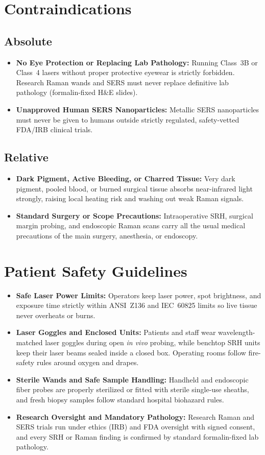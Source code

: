 \section{Contraindications}

\subsection{Absolute}
\begin{itemize}
  \item \textbf{No Eye Protection or Replacing Lab Pathology:} Running Class~3B or Class~4 lasers without proper protective eyewear is strictly forbidden. Research Raman wands and SERS must never replace definitive lab pathology (formalin-fixed H\&E slides).
  \item \textbf{Unapproved Human SERS Nanoparticles:} Metallic SERS nanoparticles must never be given to humans outside strictly regulated, safety-vetted FDA/IRB clinical trials.
\end{itemize}

\subsection{Relative}
\begin{itemize}
  \item \textbf{Dark Pigment, Active Bleeding, or Charred Tissue:} Very dark pigment, pooled blood, or burned surgical tissue absorbs near-infrared light strongly, raising local heating risk and washing out weak Raman signals.
  \item \textbf{Standard Surgery or Scope Precautions:} Intraoperative SRH, surgical margin probing, and endoscopic Raman scans carry all the usual medical precautions of the main surgery, anesthesia, or endoscopy.
\end{itemize}

\section{Patient Safety Guidelines}
\begin{itemize}
  \item \textbf{Safe Laser Power Limits:} Operators keep laser power, spot brightness, and exposure time strictly within ANSI~Z136 and IEC~60825 limits so live tissue never overheats or burns.
  \item \textbf{Laser Goggles and Enclosed Units:} Patients and staff wear wavelength-matched laser goggles during open \emph{in vivo} probing, while benchtop SRH units keep their laser beams sealed inside a closed box. Operating rooms follow fire-safety rules around oxygen and drapes.
  \item \textbf{Sterile Wands and Safe Sample Handling:} Handheld and endoscopic fiber probes are properly sterilized or fitted with sterile single-use sheaths, and fresh biopsy samples follow standard hospital biohazard rules.
  \item \textbf{Research Oversight and Mandatory Pathology:} Research Raman and SERS trials run under ethics (IRB) and FDA oversight with signed consent, and every SRH or Raman finding is confirmed by standard formalin-fixed lab pathology.
\end{itemize}

